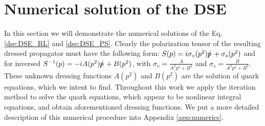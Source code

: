 %
\section{Numerical solution of the DSE}
In this section we will demonstrate the numerical solutions of the Eq. \ref{dse:DSE_RL} and \ref{dse:DSE_PS}. Clearly the polarization tensor of the resulting dressed propagator must have the following form: $S(p) =i \sigma_v(p^2) p\!\!\!/\, + \sigma_s(p^2)$ and for inversed $S^{-1}(p)=-i A(p^2)p\!\!\!/\, + B(p^2)$, with $\sigma_v = \frac{A}{A^2 p^2 + B^2}$ and $\sigma_s = \frac{B}{A^2 p^2 + B^2}$. These unknown dressing functions $A(p^2)$ and $B(p^2)$ are the solution of quark \DS equations, which we intent to find. Throughout this work we apply the iteration method to solve the quark \DS equations, which appear to be nonlinear integral equations, and obtain aforementioned dressing functions. We put a more detailed description of this numerical procedure into Appendix \ref{app:numerics}. \\

